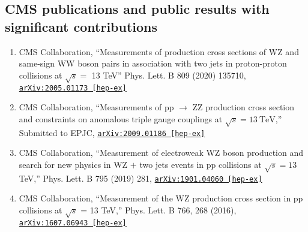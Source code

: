\documentclass[10pt]{res} %
\begin{document}
\begin{resume}
\section{CMS publications and public results with significant contributions}
\begin{enumerate}
  \item CMS Collaboration, ``Measurements of production cross sections of WZ and same-sign WW boson pairs in association with two jets in proton-proton collisions at $\sqrt{s} =$ 13 TeV'' Phys. Lett. B 809 (2020) 135710, \href{https://arxiv.org/abs/2005.01173}{\texttt{arXiv:2005.01173 [hep-ex]}}
  \item CMS Collaboration, ``Measurements of pp $\rightarrow$ ZZ production cross section and constraints on anomalous triple gauge couplings at $\sqrt{s} = 13~\mathrm{TeV}$,'' Submitted to EPJC, \href{https://arxiv.org/abs/2009.01186}{\texttt{arXiv:2009.01186 [hep-ex]}}
  \item CMS Collaboration, ``Measurement of electroweak WZ boson production and search for new physics in WZ $+$ two jets events in pp collisions at $\sqrt{s}=13$\,TeV,'' Phys. Lett. B 795 (2019) 281, \href{https://arxiv.org/abs/1901.04060} {\texttt{arXiv:1901.04060 [hep-ex]}}
  \item CMS Collaboration, ``Measurement of the WZ production cross section in pp collisions at $\sqrt{s}$ = 13 TeV,'' Phys. Lett. B 766, 268 (2016), \href{https://arxiv.org/abs/1607.06943}{\texttt{arXiv:1607.06943 [hep-ex]}}
\end{enumerate}

\end{resume}
\end{document}
